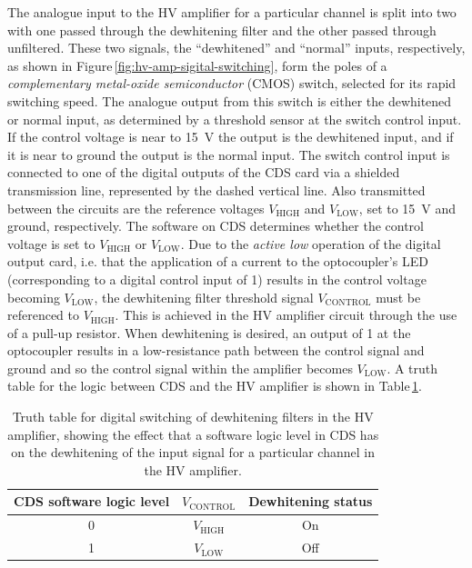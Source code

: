 The analogue input to the \gls{HV} amplifier for a particular channel is split into two with one passed through the dewhitening filter and the other passed through unfiltered. These two signals, the ``dewhitened'' and ``normal'' inputs, respectively, as shown in Figure\,\ref{fig:hv-amp-sigital-switching}, form the poles of a \emph{complementary metal-oxide semiconductor} (\gls{CMOS}) switch, selected for its rapid switching speed. The analogue output from this switch is either the dewhitened or normal input, as determined by a threshold sensor at the switch control input. If the control voltage is near to \SI{15}{\volt} the output is the dewhitened input, and if it is near to ground the output is the normal input. The switch control input is connected to one of the digital outputs of the \gls{CDS} card via a shielded transmission line, represented by the dashed vertical line. Also transmitted between the circuits are the reference voltages $V_{\text{HIGH}}$ and $V_{\text{LOW}}$, set to \SI{15}{\volt} and ground, respectively. The software on \gls{CDS} determines whether the control voltage is set to $V_{\text{HIGH}}$ or $V_{\text{LOW}}$. Due to the \emph{active low} operation of the digital output card, i.e. that the application of a current to the optocoupler's \gls{LED} (corresponding to a digital control input of \num{1}) results in the control voltage becoming $V_{\text{LOW}}$, the dewhitening filter threshold signal $V_{\text{CONTROL}}$ must be referenced to $V_{\text{HIGH}}$. This is achieved in the \gls{HV} amplifier circuit through the use of a pull-up resistor. When dewhitening is desired, an output of \num{1} at the optocoupler results in a low-resistance path between the control signal and ground and so the control signal within the amplifier becomes $V_{\text{LOW}}$. A truth table for the logic between \gls{CDS} and the \gls{HV} amplifier is shown in Table\,\ref{tab:digital-dewhitening-truth-table}.

\begin{table}
  \centering
  {\renewcommand{\arraystretch}{1.2} %
    \begin{tabular}{c|c|c}
      \textbf{\gls{CDS} software logic level} & \textbf{$V_{\text{CONTROL}}$} & \textbf{Dewhitening status} \\
      \hline
      0 & $V_{\text{HIGH}}$ & On \\
      1 & $V_{\text{LOW}}$ & Off
    \end{tabular}
  }
  \caption[Truth table for digital switching of dewhitening filters in the high voltage amplifier]{\label{tab:digital-dewhitening-truth-table}Truth table for digital switching of dewhitening filters in the \gls{HV} amplifier, showing the effect that a software logic level in \gls{CDS} has on the dewhitening of the input signal for a particular channel in the \gls{HV} amplifier.}
\end{table}

